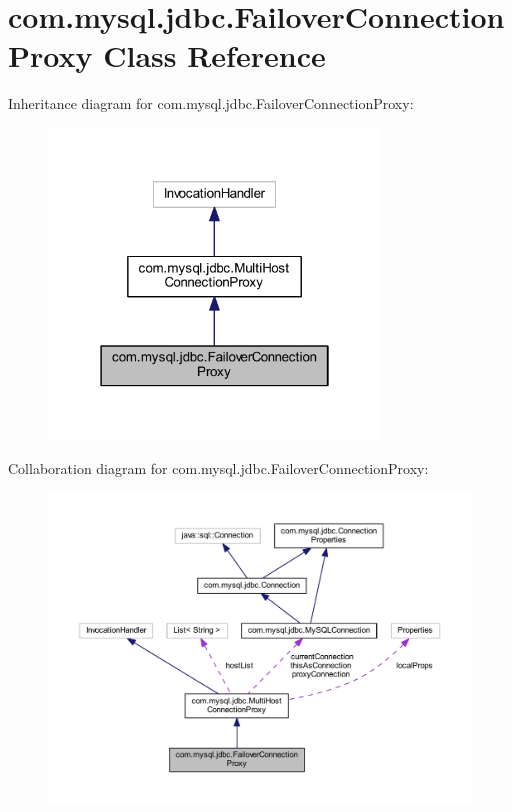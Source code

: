 \hypertarget{classcom_1_1mysql_1_1jdbc_1_1_failover_connection_proxy}{}\section{com.\+mysql.\+jdbc.\+Failover\+Connection\+Proxy Class Reference}
\label{classcom_1_1mysql_1_1jdbc_1_1_failover_connection_proxy}


Inheritance diagram for com.\+mysql.\+jdbc.\+Failover\+Connection\+Proxy\+:
\nopagebreak
\begin{figure}[H]
\begin{center}
\leavevmode
\includegraphics[width=250pt]{classcom_1_1mysql_1_1jdbc_1_1_failover_connection_proxy__inherit__graph}
\end{center}
\end{figure}


Collaboration diagram for com.\+mysql.\+jdbc.\+Failover\+Connection\+Proxy\+:
\nopagebreak
\begin{figure}[H]
\begin{center}
\leavevmode
\includegraphics[width=350pt]{classcom_1_1mysql_1_1jdbc_1_1_failover_connection_proxy__coll__graph}
\end{center}
\end{figure}
